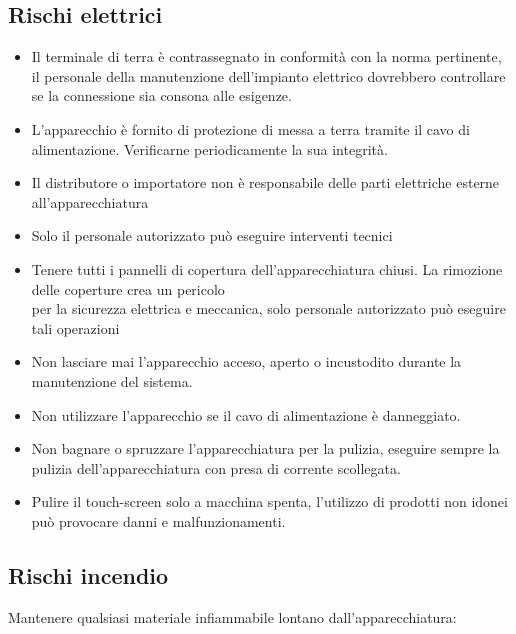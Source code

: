\documentclass[a4paper]{article}
\begin{document}
\subsection{Rischi elettrici}
\begin{itemize}
  \item Il terminale di terra è contrassegnato in conformità con la norma pertinente, il personale della manutenzione dell'impianto elettrico dovrebbero controllare se la connessione sia consona alle esigenze.
  \item L'apparecchio è fornito di protezione di messa a terra tramite il cavo di alimentazione. Verificarne periodicamente la sua integrità.
  \item Il distributore o importatore non è responsabile delle parti elettriche esterne all'apparecchiatura
  \item Solo il personale autorizzato può eseguire interventi tecnici
  \item Tenere tutti i pannelli di copertura dell'apparecchiatura chiusi. La rimozione delle coperture crea un pericolo\\
per la sicurezza elettrica e meccanica, solo personale autorizzato può eseguire tali operazioni
  \item Non lasciare mai l'apparecchio acceso, aperto o incustodito durante la manutenzione del sistema.
  \item Non utilizzare l'apparecchio se il cavo di alimentazione è danneggiato.
  \item Non bagnare o spruzzare l'apparecchiatura per la pulizia, eseguire sempre la pulizia dell'apparecchiatura con presa di corrente scollegata.
  \item Pulire il touch-screen solo a macchina spenta, l'utilizzo di prodotti non idonei può provocare danni e malfunzionamenti.
\end{itemize}

\subsection{Rischi incendio}
Mantenere qualsiasi materiale infiammabile lontano dall'apparecchiatura:
\end{document}
